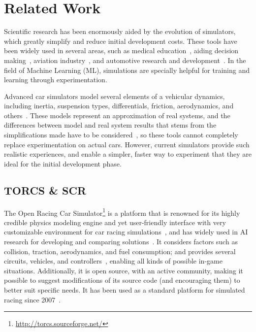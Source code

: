 \section{Related Work}\label{sec:2}
Scientific research has been enormously aided by the evolution of simulators, which greatly simplify and reduce initial development costs. These tools have been widely used in several areas, such as medical education~\cite{MEDIC}, aiding decision making~\cite{useOfSimulaton2002}, aviation industry~\cite{AIR}, and automotive research and development~\cite{AUTR}. In the field of Machine Learning (ML), simulations are specially helpful for training and learning through experimentation.

Advanced car simulators model several elements of a vehicular dynamics, including inertia, suspension types, differentials, friction, aerodynamics, and others~\cite{TORCS}. These models represent an approximation of real systems, and the differences between model and real system results that stems from the simplifications made have to be considered~\cite{brookes2012authentic}, so these tools cannot completely replace experimentation on actual cars. However, current simulators provide such realistic experiences, and enable a simpler, faster way to experiment that they are ideal for the initial development phase.






\subsection{TORCS \& SCR}
The Open Racing Car Simulator\footnote{\url{http://torcs.sourceforge.net/}} is a platform that is renowned for its highly credible physics modeling engine and yet user-friendly interface with very customizable environment for car racing simulations~\cite{SCR,TORCS}, and has widely used in AI research for developing and comparing solutions~\cite{2009}. It considers factors such as collision, traction, aerodynamics, and fuel consumption; and provides several circuits, vehicles, and controllers~\cite{2009,Loiacono:2012:LEA:2212908.2212953}, enabling all kinds of possible in-game situations. Additionally, it is open source, with an active community, making it possible to suggest modifications of its source code (and encouraging them) to better suit specific needs. It has been used as a standard platform for simulated racing since 2007~\cite{Loiacono:2012:LEA:2212908.2212953}.

